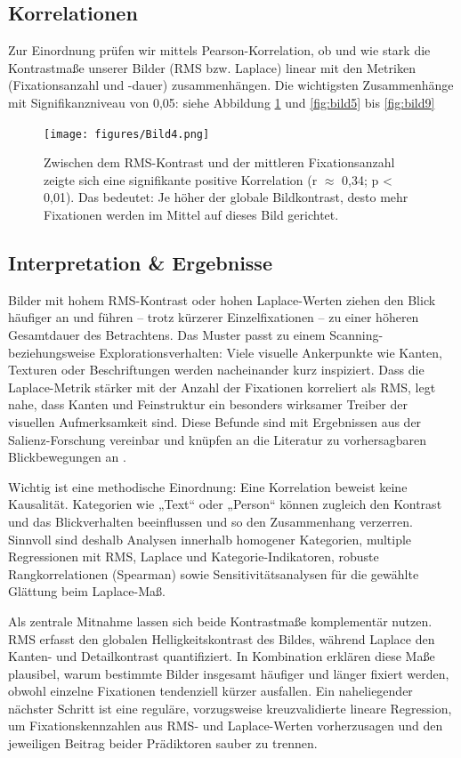\documentclass[
    language=german, %
    thesis=seminar, %
    supervisor=postdoc, %
    multiauthor=true, %
    ]{settings/csssa-thesis}
\begin{document}
\subsection{Korrelationen}
Zur Einordnung prüfen wir mittels Pearson-Korrelation, ob und wie stark die Kontrastmaße unserer Bilder (RMS bzw. Laplace) linear mit den Metriken (Fixationsanzahl und -dauer) zusammenhängen.
Die wichtigsten Zusammenhänge mit Signifikanzniveau von 0,05:
siehe Abbildung \ref{fig:bild4} und \ref{fig:bild5} bis \ref{fig:bild9}

\begin{figure}[h]
    \centering
    \texttt{[image: figures/Bild4.png]}
    \caption{
          Zwischen dem RMS-Kontrast und der mittleren Fixationsanzahl zeigte sich eine signifikante positive Korrelation (r $\approx$ 0,34; p < 0,01). Das bedeutet: Je höher der globale Bildkontrast, desto mehr Fixationen werden im Mittel auf dieses Bild gerichtet.
}\label{fig:bild4}
\end{figure}

\subsection{Interpretation \& Ergebnisse}
Bilder mit hohem RMS-Kontrast oder hohen Laplace-Werten ziehen den Blick häufiger an und führen 
– trotz kürzerer Einzel­fixationen – zu einer höheren Gesamtdauer des Betrachtens. 
Das Muster passt zu einem Scanning- beziehungsweise Explorationsverhalten: 
Viele visuelle Ankerpunkte wie Kanten, Texturen oder Beschriftungen werden nacheinander kurz inspiziert. 
Dass die Laplace-Metrik stärker mit der Anzahl der Fixationen korreliert als RMS, legt nahe, 
dass Kanten und Feinstruktur ein besonders wirksamer Treiber der visuellen Aufmerksamkeit sind. 
Diese Befunde sind mit Ergebnissen aus der Salienz-Forschung vereinbar und knüpfen 
an die Literatur zu vorhersagbaren Blickbewegungen an \citep{Foulsham2008}. 

Wichtig ist eine methodische Einordnung: Eine Korrelation beweist keine Kausalität. Kategorien wie „Text“ oder „Person“ können zugleich den Kontrast und das Blickverhalten beeinflussen und so den Zusammenhang verzerren. Sinnvoll sind deshalb Analysen innerhalb homogener Kategorien, multiple Regressionen mit RMS, Laplace und Kategorie-Indikatoren, robuste Rangkorrelationen (Spearman) sowie Sensitivitätsanalysen für die gewählte Glättung beim Laplace-Maß. 

Als zentrale Mitnahme lassen sich beide Kontrastmaße komplementär nutzen. RMS erfasst den globalen Helligkeitskontrast des Bildes, während Laplace den Kanten- und Detailkontrast quantifiziert. In Kombination erklären diese Maße plausibel, warum bestimmte Bilder insgesamt häufiger und länger fixiert werden, obwohl einzelne Fixationen tendenziell kürzer ausfallen. Ein naheliegender nächster Schritt ist eine reguläre, vorzugsweise kreuzvalidierte lineare Regression, um Fixationskennzahlen aus RMS- und Laplace-Werten vorherzusagen und den jeweiligen Beitrag beider Prädiktoren sauber zu trennen.
\end{document}
